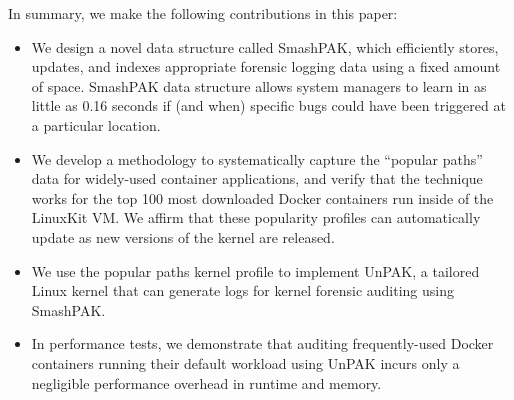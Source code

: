 In summary, we make the following contributions in this paper:
\begin{itemize}
	\item We design a novel data structure called SmashPAK, which efficiently stores, updates, and indexes appropriate forensic logging data using a fixed amount of space. SmashPAK data structure allows system managers to learn in as little as 0.16 seconds if (and when) specific bugs could have been triggered at a particular location.
	\item We develop a methodology to systematically capture the “popular paths” data for widely-used container applications, and verify that the technique works for the top 100 most downloaded Docker containers run inside of the LinuxKit VM.  We affirm that these popularity profiles can automatically update as new versions of the kernel are released.
	\item We use the popular paths kernel profile to implement UnPAK, a  tailored  Linux kernel that can generate logs for kernel forensic auditing using SmashPAK. 
	\item In performance tests, we demonstrate that auditing frequently-used Docker containers running their default workload using UnPAK incurs only a negligible performance overhead in runtime and memory. 
\end{itemize}